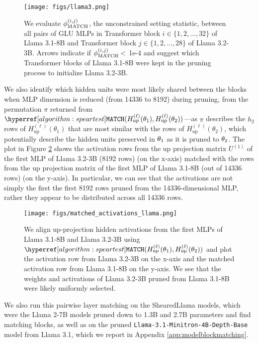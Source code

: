 \begin{figure}[h]
    \centering
    \texttt{[image: figs/llama3.png]}
    \caption{We evaluate $\phi_{\textup{MATCH}}^{(i,j)}$, the unconstrained setting statistic, between all pairs of GLU MLPs in Transformer block $i \in \{1, 2, \dots, 32 \}$ of Llama 3.1-8B and Transformer block $j \in \{1, 2, \dots, 28 \}$ of Llama 3.2-3B. Arrows indicate if $\phi_{\textup{MATCH}}^{(i,j)} < $ 1e-4 and suggest which Transformer blocks of Llama 3.1-8B were kept in the pruning process to initialize Llama 3.2-3B.}
    \label{fig:llama-match}
\end{figure}

We also identify which hidden units were most likely shared between the blocks when MLP dimension is reduced (from 14336 to 8192) during pruning, from the permutation $\pi$ returned from $\speartest(H_\text{up}^{(\ell)}(\theta_1),H_\text{up}^{(\ell)}(\theta_2))$---as $\pi$ describes the $h_2$ rows of $H_\text{up}^{(\ell)}(\theta_1)$ that are most similar with the rows of $H_\text{up}^{(\ell)}(\theta_2)$, which potentially describe the hidden units preserved in $\theta_1$ as it is pruned to $\theta_2$. The plot in Figure \ref{fig:matched-activations-llama} shows the activation rows from the up projection matrix $U^{(1)}$ of the first MLP of Llama 3.2-3B (8192 rows) (on the x-axis) matched with the rows from the up projection matrix of the first MLP of Llama 3.1-8B (out of 14336 rows) (on the y-axis). In particular, we can see that the activations are not simply the first the first 8192 rows pruned from the 14336-dimensional MLP, rather they appear to be distributed across all 14336 rows. 


\begin{figure}
    \centering
    \texttt{[image: figs/matched\_activations\_llama.png]}
    \caption{We align up-projection hidden activations from the first MLPs of Llama 3.1-8B and Llama 3.2-3B using $\speartest(H_\text{up}^{(\ell)}(\theta_1),H_\text{up}^{(\ell)}(\theta_2))$ and plot the activation row from Llama 3.2-3B on the x-axis and the matched activation row from Llama 3.1-8B on the y-axis. We see that the weights and activations of Llama 3.2-3B pruned from Llama 3.1-8B were likely uniformly selected.}
    \label{fig:matched-activations-llama}
\end{figure}

We also run this pairwise layer matching on the ShearedLlama \citep{xia2024shearedllamaacceleratinglanguage} models, which were the Llama 2-7B models pruned down to 1.3B and 2.7B parameters and find matching blocks, as well as on the pruned \texttt{Llama-3.1-Minitron-4B-Depth-Base} model \citep{muralidharan2024compactlanguagemodelspruning} from Llama 3.1, which we report in Appendix \ref{app:modelblockmatching}. 